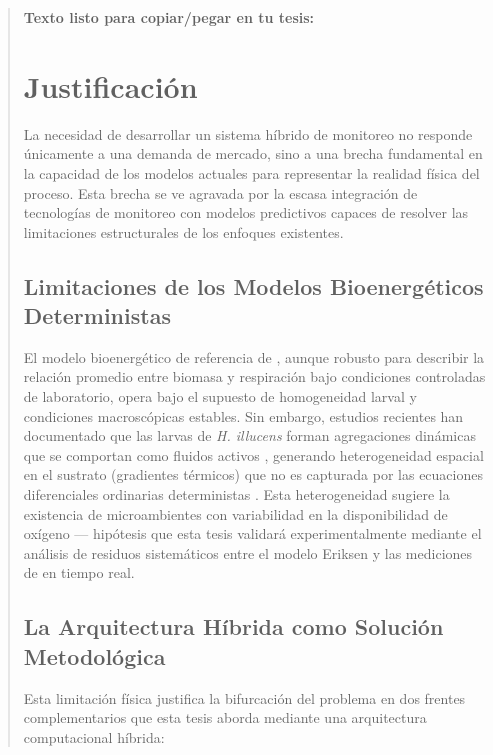 \documentclass[12pt,oneside]{book}
\begin{document}
\begin{quote}
\textbf{Texto listo para copiar/pegar en tu tesis:}

\section{Justificación}

La necesidad de desarrollar un sistema híbrido de monitoreo no responde únicamente a una demanda de mercado, sino a una brecha fundamental en la capacidad de los modelos actuales para representar la realidad física del proceso. Esta brecha se ve agravada por la escasa integración de tecnologías de monitoreo con modelos predictivos capaces de resolver las limitaciones estructurales de los enfoques existentes.

\subsection{Limitaciones de los Modelos Bioenergéticos Deterministas}
El modelo bioenergético de referencia de \textcite{eriksen2022growth}, aunque robusto para describir la relación promedio entre biomasa y respiración bajo condiciones controladas de laboratorio, opera bajo el supuesto de homogeneidad larval y condiciones macroscópicas estables. Sin embargo, estudios recientes han documentado que las larvas de \textit{H. illucens} forman agregaciones dinámicas que se comportan como fluidos activos \parencite{ko2021air}, generando heterogeneidad espacial en el sustrato (gradientes térmicos) que no es capturada por las ecuaciones diferenciales ordinarias deterministas \parencite{tomberlin2025bugbook}. Esta heterogeneidad sugiere la existencia de microambientes con variabilidad en la disponibilidad de oxígeno --- hipótesis que esta tesis validará experimentalmente mediante el análisis de residuos sistemáticos entre el modelo Eriksen y las mediciones de  en tiempo real.

\subsection{La Arquitectura Híbrida como Solución Metodológica}
Esta limitación física justifica la bifurcación del problema en dos frentes complementarios que esta tesis aborda mediante una arquitectura computacional híbrida:


\end{quote}
\end{document}
